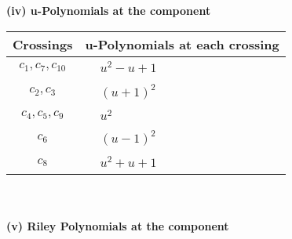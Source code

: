 \documentclass[1p]{elsarticle_modified}
\theoremstyle{definition}
\begin{document}
\newpage\renewcommand{\arraystretch}{1}
\flushleft \textbf{(iv) u-Polynomials at the component}\newline \\
\begin{tabular}{m{50pt}|m{274pt}}
Crossings & \hspace{64pt}u-Polynomials at each crossing \\
\hline $$\begin{aligned}c_{1},c_{7},c_{10}\end{aligned}$$&$\begin{aligned}
&u^2- u+1
\end{aligned}$\\
\hline $$\begin{aligned}c_{2},c_{3}\end{aligned}$$&$\begin{aligned}
&(u+1)^2
\end{aligned}$\\
\hline $$\begin{aligned}c_{4},c_{5},c_{9}\end{aligned}$$&$\begin{aligned}
&u^2
\end{aligned}$\\
\hline $$\begin{aligned}c_{6}\end{aligned}$$&$\begin{aligned}
&(u-1)^2
\end{aligned}$\\
\hline $$\begin{aligned}c_{8}\end{aligned}$$&$\begin{aligned}
&u^2+u+1
\end{aligned}$\\
\hline
\end{tabular}\\~\\
\newpage\renewcommand{\arraystretch}{1}
\flushleft \textbf{(v) Riley Polynomials at the component}\newline \\
\end{document}
